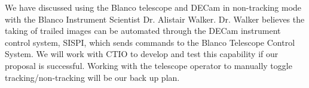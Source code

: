 \documentclass[11pt]{article}
\begin{document}



%
%




\specialrequest

We have discussed using the Blanco telescope and DECam in non-tracking mode with the Blanco Instrument Scientist Dr. Alistair Walker. Dr. Walker believes the taking of trailed images can be automated through the DECam instrument control system, SISPI, which sends commands to the Blanco Telescope Control System. We will work with CTIO to develop and test this capability if our proposal is successful. Working with the telescope operator to manually toggle tracking/non-tracking will be our back up plan.

\end{document}
